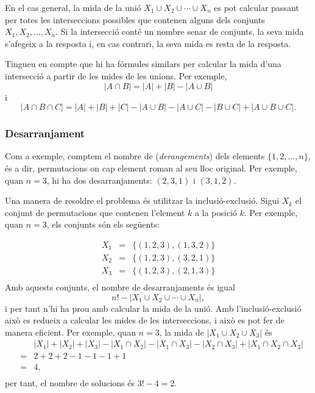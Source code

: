En el cas general, la mida de la unió $X_1 \cup X_2 \cup \cdots \cup
X_n$ es pot calcular passant per totes les interseccions possibles que
contenen alguns dels conjunts $X_1,X_2,\ldots,X_n$. Si la intersecció
conté un nombre senar de conjunts, la seva mida s'afegeix a la
resposta i, en cas contrari, la seva mida es resta de la resposta.

Tingueu en compte que hi ha fórmules similars per calcular la mida
d'una intersecció a partir de les mides de les unions. Per exemple,
\[ |A \cap B| = |A| + |B| - |A \cup B|\]
i
\[ |A \cap B \cap C| = |A| + |B| + |C| - |A \cup B|  - |A \cup C|  - |B \cup C| + |A \cup B \cup C| .\]


\subsubsection{Desarranjament}


Com a exemple, comptem el nombre de 
(\emph{derangements}) dels elements $\{1,2,\ldots,n\}$, és a dir,
permutacions on cap element roman al seu lloc original. Per exemple,
quan $n=3$, hi ha dos desarranjaments: $(2,3,1)$ i $(3,1,2)$.

Una manera de resoldre el problema és utilitzar la
inclusió-exclusió. Sigui $X_k$ el conjunt de permutacions que contenen
l'element $k$ a la posició $k$. Per exemple, quan $n=3$, els conjunts
són els següents:

\[
\begin{array}{lcl}
X_1 & = & \{(1,2,3),(1,3,2)\} \\
X_2 & = & \{(1,2,3),(3,2,1)\} \\
X_3 & = & \{(1,2,3),(2,1,3)\} \\
\end{array}
\]
Amb aquests conjunts, el nombre de desarranjaments és igual
\[ n! - |X_1 \cup X_2 \cup \cdots \cup X_n|, \]
i per tant n'hi ha prou amb calcular la mida de la unió. Amb
l'inclusió-exclusió això es redueix a calcular les mides de les
interseccions, i això es pot fer de manera eficient. Per exemple, quan
$n=3$, la mida de $|X_1 \cup X_2 \cup X_3|$ és
\[
\begin{array}{lcl}
 & & |X_1| + |X_2| + |X_3| - |X_1 \cap X_2|  - |X_1 \cap X_3|  - |X_2 \cap X_3| + |X_1 \cap X_2 \cap X_3| \\
 & = & 2+2+2-1-1-1+1 \\
 & = & 4, \\
\end{array}
\]
per tant, el nombre de solucions és $3!-4=2$.

